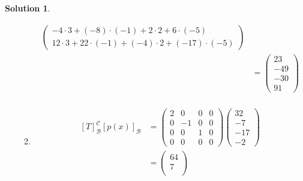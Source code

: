 \documentclass[10pt]{article}
\theoremstyle{definition}
\newtheorem{soln}{Solution}
\begin{document}
\begin{soln}
\begin{enumerate}[label=(\alph*)]
\begin{enumerate}[label=(\roman*)]
\begin{align*}
\begin{pmatrix}
                          -4\cdot 3+(-8)\cdot (-1)+2\cdot 2+6\cdot(-5)     \\
                          12\cdot 3+22\cdot (-1)+(-4)\cdot 2+(-17)\cdot (-5)
                        \end{pmatrix} \\
                     & =\begin{pmatrix}
                          23  \\
                          -49 \\
                          -30 \\
                          91
                        \end{pmatrix}                                    \\
                  \end{align*}
            \item \begin{align*}
                    \left[T\right]_\mathcal{B}^\mathcal{C}
                    \left[p(x)\right]_\mathcal{B} & =\begin{pmatrix}
                                                       2 & 0  & 0 & 0 \\
                                                       0 & -1 & 0 & 0 \\
                                                       0 & 0  & 1 & 0 \\
                                                       0 & 0  & 0 & 0
                                                     \end{pmatrix}\begin{pmatrix}
                                                                    32  \\
                                                                    -7  \\
                                                                    -17 \\
                                                                    -2
                                                                  \end{pmatrix} \\
                                                  & = \begin{pmatrix}
                                                        64  \\
                                                        7   \\

\end{pmatrix}
\end{align*}
\end{enumerate}
\end{enumerate}
\end{soln}
\end{document}
